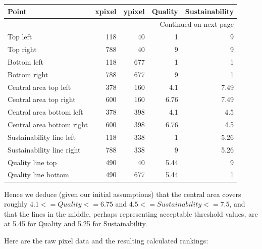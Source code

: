 \documentclass[article,10pt,microtype]{article}
\begin{document}
\begin{longtable}{lrrrr}
\label{testing-calculations}
\\
Point & xpixel & ypixel & Quality & Sustainability\\
\hline
\endhead
\hline\multicolumn{5}{r}{Continued on next page} \\
\endfoot
\endlastfoot
Top left & 118 & 40 & 1 & 9\\
Top right & 788 & 40 & 9 & 9\\
Bottom left & 118 & 677 & 1 & 1\\
Bottom right & 788 & 677 & 9 & 1\\
Central area top left & 378 & 160 & 4.1 & 7.49\\
Central area top right & 600 & 160 & 6.76 & 7.49\\
Central area bottom left & 378 & 398 & 4.1 & 4.5\\
Central area bottom right & 600 & 398 & 6.76 & 4.5\\
Sustainability line left & 118 & 338 & 1 & 5.26\\
Sustainability line right & 788 & 338 & 9 & 5.26\\
Quality line top & 490 & 40 & 5.44 & 9\\
Quality line bottom & 490 & 677 & 5.44 & 1\\
\end{longtable}

Hence we deduce (given our initial assumptions) that the central area covers roughly \(4.1 <= Quality <= 6.75\) and \( 4.5 <= Sustainability <= 7.5\), and that the lines in the middle, perhaps representing acceptable threshold values, are at 5.45 for Quality and 5.25 for Sustainability.

Here are the raw pixel data and the resulting calculated rankings:
\end{document}
